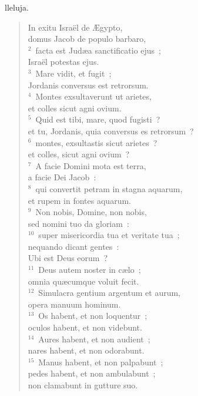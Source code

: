 \bchapter
{}lleluja. \begin{flushleft}\begin{verse}\vspace{6pt}In exitu Isra\"el de \AE gypto,\\ domus Jacob de populo barbaro,\\
${}^{2}$~facta est Jud\ae a sanctificatio ejus~;\\ Isra\"el potestas ejus.\\
${}^{3}$~Mare vidit, et fugit~;\\ Jordanis conversus est retrorsum.\\
${}^{4}$~Montes exsultaverunt ut arietes,\\ et colles sicut agni ovium.\\
${}^{5}$~Quid est tibi, mare, quod fugisti~?\\ et tu, Jordanis, quia conversus es retrorsum~?\\
${}^{6}$~montes, exsultastis sicut arietes~?\\ et colles, sicut agni ovium~?\\
${}^{7}$~A facie Domini mota est terra,\\ a facie Dei Jacob~:\\
${}^{8}$~qui convertit petram in stagna aquarum,\\ et rupem in fontes aquarum.\\
${}^{9}$~Non nobis, Domine, non nobis,\\ sed nomini tuo da gloriam~:\\
${}^{10}$~super misericordia tua et veritate tua~;\\ nequando dicant gentes~:\\ Ubi est Deus eorum~?\\
${}^{11}$~Deus autem noster in c\ae lo~;\\ omnia qu\ae cumque voluit fecit.\\
${}^{12}$~Simulacra gentium argentum et aurum,\\ opera manuum hominum.\\
${}^{13}$~Os habent, et non loquentur~;\\ oculos habent, et non videbunt.\\
${}^{14}$~Aures habent, et non audient~;\\ nares habent, et non odorabunt.\\
${}^{15}$~Manus habent, et non palpabunt~;\\ pedes habent, et non ambulabunt~;\\ non clamabunt in gutture suo.\\

\end{verse}
\end{flushleft}
